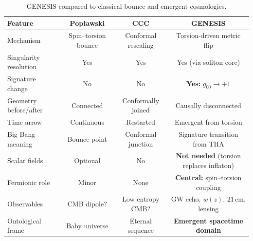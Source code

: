 \documentclass{article}
\begin{document}
\begin{table}[h!]
\centering
\renewcommand{\arraystretch}{1.3}
\begin{tabular}{p{4.2cm} | c | c | c}
\toprule
\textbf{Feature} & \textbf{Popławski} & \textbf{CCC} & \textbf{GENESIS} \\
\midrule
Mechanism & Spin–torsion bounce & Conformal rescaling & Torsion-driven metric flip \\
Singularity resolution & Yes & Yes & Yes (via soliton core) \\
Signature change & No & No & \textbf{Yes: } $g_{00} \rightarrow +1$ \\
Geometry before/after & Connected & Conformally joined & Causally disconnected \\
Time arrow & Continuous & Restarted & Emergent from torsion \\
Big Bang meaning & Bounce point & Conformal junction & Signature transition from THA \\
Scalar fields & Optional & No & \textbf{Not needed} (torsion replaces inflaton) \\
Fermionic role & Minor & None & \textbf{Central: } spin–torsion coupling \\
Observables & CMB dipole? & Low entropy CMB? & GW echo, $w(z)$, $21\,\text{cm}$, lensing \\
Ontological frame & Baby universe & Eternal sequence & \textbf{Emergent spacetime domain} \\
\bottomrule
\end{tabular}
\caption{GENESIS compared to classical bounce and emergent cosmologies.}
\label{tab:bounce-classical}
\end{table}
\end{document}
